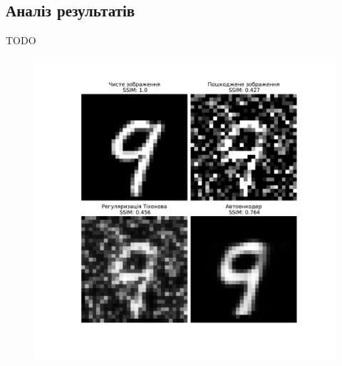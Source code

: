\documentclass[14pt,a4paper]{extarticle}
\newcounter{e}
\numberwithin{equation}{section}
\numberwithin{figure}{section}
\begin{document}

	\subsection{Аналіз результатів}	
	TODO
	\begin{figure}[H]
		\centering
		\includegraphics[width=1\textwidth]{resources/denoising_methods_comparation.pdf}
		\caption{}
		\label{fig:denoising-methods-comparation}
	\end{figure}
		
		
	
\end{document}
